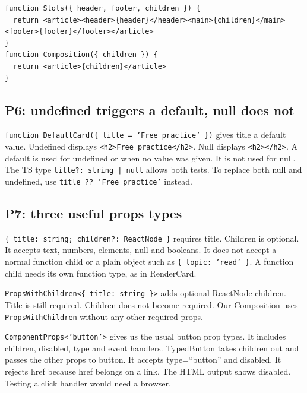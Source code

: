 \documentclass[
  10pt,
  a4paper,
]{article}
\begin{document}
\begin{minipage}{\linewidth}

\begin{lstlisting}
function Slots({ header, footer, children }) {
  return <article><header>{header}</header><main>{children}</main><footer>{footer}</footer></article>
}
function Composition({ children }) {
  return <article>{children}</article>
}
\end{lstlisting}

\end{minipage}\par

\subsection{P6: undefined triggers a default, null does
not}\label{p6-undefined-triggers-a-default-null-does-not}

\texttt{function DefaultCard(\{ title = 'Free practice' \})} gives title
a default value. Undefined displays
\texttt{<h2>Free practice</\allowbreak{}h2>}. Null displays
\texttt{<h2></\allowbreak{}h2>}. A default is used for undefined or when
no value was given. It is not used for null. The TS type
\texttt{title?:\allowbreak{} string | null} allows both tests. To
replace both null and undefined, use \texttt{title ?? 'Free practice'}
instead.

\subsection{P7: three useful props
types}\label{p7-three-useful-props-types}

\texttt{\{ title:\allowbreak{} string; children?:\allowbreak{} ReactNode \}}
requires title. Children is optional. It accepts text, numbers,
elements, null and booleans. It does not accept a normal function child
or a plain object such as \texttt{\{ topic:\allowbreak{} 'read' \}}. A
function child needs its own function type, as in RenderCard.

\texttt{PropsWithChildren<\{ title:\allowbreak{} string \}>} adds
optional ReactNode children. Title is still required. Children does not
become required. Our Composition uses \texttt{PropsWithChildren} without
any other required props.

\texttt{ComponentProps<'button'>} gives us the usual button prop types.
It includes children, disabled, type and event handlers. TypedButton
takes children out and passes the other props to button. It accepts
type=``button'' and disabled. It rejects href because href belongs on a
link. The HTML output shows disabled. Testing a click handler would need
a browser.
\end{document}
